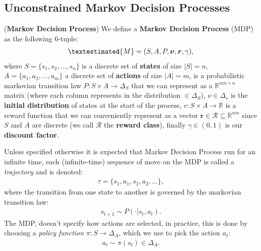 
\subsection{Unconstrained Markov Decision Processes} \label{sec:unconstrained_mds}
\begin{definition}
    (\textbf{Markov Decision Process})
    We define a \textbf{Markov Decision Process} (MDP) as the following $6$-tuple: 
    \begin{align*}
        \textestimated{M} = (S,A,P,\bm{\nu},\bm{r},\gamma),
    \end{align*}
    where $S = \{s_1,s_2,...,s_n\}$ is a discrete set of \textbf{states} of size $|S| = n$, $A = \{a_1,a_2,...,a_m\}$ a discrete set of \textbf{actions} of size $|A|=m$, is a probabilistic markovian transition law $P:S\times A \rightarrow \Delta_{S}$ that we can represent as a $\mathbb{R}^{nm\times n}$ matrix (where each column represents in the distribution $\in \Delta_S$), $\nu\in \Delta_s$ is the \textbf{initial distribution} of states at the start of the process, $r:S \times A\rightarrow \mathbb{R}$ is a reward function that we can conveniently represent as a vector $\bm{r}\in\mathcal{R}\subseteq\mathbb{R}^{nm}$ since $S$ and $A$ are discrete (we call $\mathcal{R}$ the \textbf{reward class}), finally $\gamma\in(0,1)$ is our \textbf{discount factor}. \\
\end{definition}


Unless specified otherwise it is expected that Markov Decision Process run for an infinite time, each (infinite-time) sequence of move on the MDP is called a \textit{trajectory} and is denoted:
\begin{align*}
    \tau = \{s_1,a_1,s_2,a_2,...\},
\end{align*}
\noindent
where the transition from one state to another is governed by the markovian transition law: 
\begin{align*}
    s_{t+1} \sim P(\cdot|s_t,a_t).
\end{align*} 
The MDP, doesn't specify how actions are selected, in practice, this is done by choosing a \textit{policy function} $\pi:S\rightarrow \Delta_A$, which we use to pick the action $a_t$:
\begin{align*}
    a_t \sim \pi(s_t) \in \Delta_A.
\end{align*}

